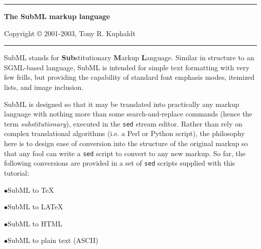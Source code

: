  
\hrule \bigskip 
\centerline{\bf The SubML markup language} \bigskip 
 

Copyright \copyright{} 2001-2003, Tony R. Kuphaldt
 

\bigskip \hrule \bigskip 
\noindent {} \bigskip 
 
SubML stands for {\bf Sub}stitutionary {\bf M}arkup {\bf L}anguage.  Similar in structure to an SGML-based language, SubML is intended for simple text formatting with very few frills, but providing the capability of standard font emphasis modes, itemized lists, and image inclusion.  

 
SubML is designed so that it may be translated into practically any markup language with nothing more than some search-and-replace commands (hence the term {\it substitutionary}), executed in the {\tt sed} stream editor.  Rather than rely on complex translational algorithms (i.e. a Perl or Python script), the philosophy here is to design ease of conversion into the structure of the original markup so that any fool can write a {\tt sed} script to convert to any new markup.  So far, the following conversions are provided in a set of {\tt sed} scripts supplied with this tutorial: 

\medskip 
\item{$\bullet$}SubML to \TeX{}
\item{$\bullet$}SubML to LA\TeX{}
\item{$\bullet$}SubML to HTML
\item{$\bullet$}SubML to plain text (ASCII)
\medskip 
 

